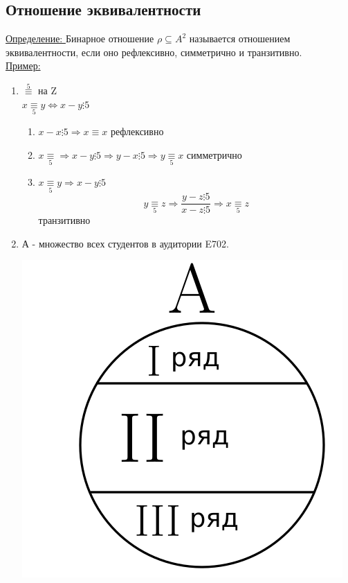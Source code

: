 \documentclass[12pt]{article}
\let\ORIincludegraphics\includegraphics
\renewcommand{\includegraphics}[2][]{\ORIincludegraphics[scale=0.65,#1]{#2}}
\begin{document}
    \subsection{Отношение эквивалентности}
    \underline{Определение: } Бинарное отношение $\rho \subseteq A^2$ называется отношением эквивалентности, если оно рефлексивно,
    симметрично и транзитивно.\\
    \underline{Пример:} 
    \begin{enumerate}
        \item $\overset{5}{\equiv}$ на Z\\
        $x \underset{5}{\equiv} y \Leftrightarrow x-y \vdots 5$
        \begin{enumerate}
            \item $x-x \vdots 5 \Rightarrow x \equiv x $ рефлексивно
            \item $x \underset{5}{\equiv} \Rightarrow x-y\vdots 5 \Rightarrow y-x \vdots 5 \Rightarrow y \underset{5}{\equiv} x $ симметрично
            \item $x \underset{5}{\equiv} y \Rightarrow x-y\vdots 5$
            \[y\underset{5}{\equiv}z\Rightarrow \frac{y-z\vdots 5}{x-z\vdots 5}\Rightarrow x \underset{5}{\equiv} z \] транзитивно
        \end{enumerate}
        \item  А - множество всех студентов в аудитории E702.\\
        \begin{minipage}{0.3\textwidth}
            \includegraphics[scale=0.3]{1.1.png}

\end{minipage}
\end{enumerate}
\end{document}
